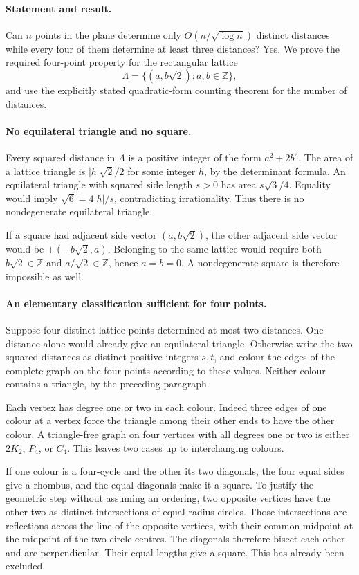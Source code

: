 \paragraph{Statement and result.}
Can \(n\) points in the plane determine only \(O(n/\sqrt{\log n})\) distinct distances while every four of them determine at least three distances? Yes. We prove the required four-point property for the rectangular lattice
\[
 \Lambda=\{(a,b\sqrt2):a,b\in\mathbb Z\},
\]
and use the explicitly stated quadratic-form counting theorem for the number of distances.

\paragraph{No equilateral triangle and no square.}
Every squared distance in \(\Lambda\) is a positive integer of the form \(a^2+2b^2\). The area of a lattice triangle is \(|h|\sqrt2/2\) for some integer \(h\), by the determinant formula. An equilateral triangle with squared side length \(s>0\) has area \(s\sqrt3/4\). Equality would imply \(\sqrt6=4|h|/s\), contradicting irrationality. Thus there is no nondegenerate equilateral triangle.

If a square had adjacent side vector \((a,b\sqrt2)\), the other adjacent side vector would be \(\pm(-b\sqrt2,a)\). Belonging to the same lattice would require both \(b\sqrt2\in\mathbb Z\) and \(a/\sqrt2\in\mathbb Z\), hence \(a=b=0\). A nondegenerate square is therefore impossible as well.

\paragraph{An elementary classification sufficient for four points.}
Suppose four distinct lattice points determined at most two distances. One distance alone would already give an equilateral triangle. Otherwise write the two squared distances as distinct positive integers \(s,t\), and colour the edges of the complete graph on the four points according to these values. Neither colour contains a triangle, by the preceding paragraph.

Each vertex has degree one or two in each colour. Indeed three edges of one colour at a vertex force the triangle among their other ends to have the other colour. A triangle-free graph on four vertices with all degrees one or two is either \(2K_2\), \(P_4\), or \(C_4\). This leaves two cases up to interchanging colours.

If one colour is a four-cycle and the other its two diagonals, the four equal sides give a rhombus, and the equal diagonals make it a square. To justify the geometric step without assuming an ordering, two opposite vertices have the other two as distinct intersections of equal-radius circles. Those intersections are reflections across the line of the opposite vertices, with their common midpoint at the midpoint of the two circle centres. The diagonals therefore bisect each other and are perpendicular. Their equal lengths give a square. This has already been excluded.

